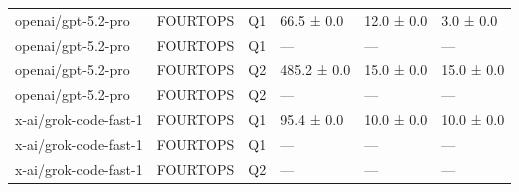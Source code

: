 \begin{table}
\begin{tabular}{llllll}
openai/gpt-5.2-pro & FOURTOPS & Q1 & 66.5 ± 0.0 & 12.0 ± 0.0 & 3.0 ± 0.0 \\
openai/gpt-5.2-pro & FOURTOPS & Q1 & — & — & — \\
openai/gpt-5.2-pro & FOURTOPS & Q2 & 485.2 ± 0.0 & 15.0 ± 0.0 & 15.0 ± 0.0 \\
openai/gpt-5.2-pro & FOURTOPS & Q2 & — & — & — \\
x-ai/grok-code-fast-1 & FOURTOPS & Q1 & 95.4 ± 0.0 & 10.0 ± 0.0 & 10.0 ± 0.0 \\
x-ai/grok-code-fast-1 & FOURTOPS & Q1 & — & — & — \\
x-ai/grok-code-fast-1 & FOURTOPS & Q2 & — & — & — \\
\bottomrule
\end{tabular}
\end{table}
